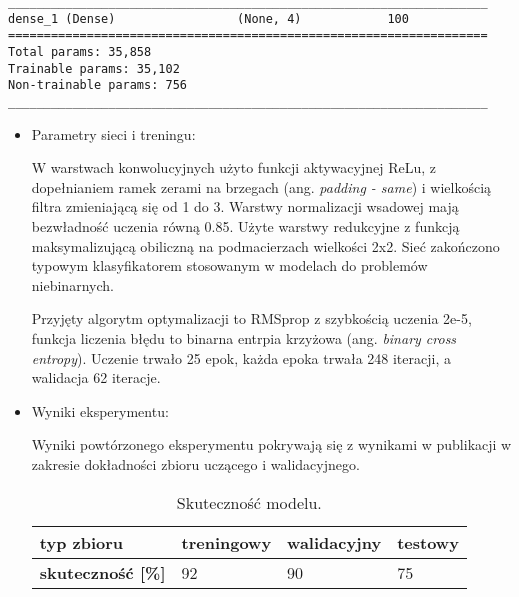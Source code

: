 \newsavebox\myvvvvv
\begin{lrbox}{\myvvvvv}
\setlength{\myminipagewidth}{0.9\linewidth} %
\setlength{\myminipagecentering}{(\linewidth-\myminipagewidth)/2}
\noindent\hspace{\myminipagecentering}\begin{minipage}{\myminipagewidth}
\begin{verbatim}
___________________________________________________________________
dense_1 (Dense)                 (None, 4)            100    
===================================================================
Total params: 35,858
Trainable params: 35,102
Non-trainable params: 756
___________________________________________________________________
\end{verbatim} 
\end{minipage}\end{lrbox}
\resizebox{0.75\textwidth}{!}{\usebox\myvvvvv}

\begin{itemize}
\item Parametry sieci i treningu:

W warstwach konwolucyjnych użyto funkcji aktywacyjnej ReLu, z dopełnianiem ramek zerami na brzegach (ang. \textit{padding - same}) i wielkością filtra zmieniającą się od 1 do 3. Warstwy normalizacji wsadowej mają bezwładność uczenia równą 0.85. Użyte warstwy redukcyjne z funkcją maksymalizującą obiliczną na podmacierzach wielkości 2x2. Sieć zakończono typowym klasyfikatorem stosowanym w modelach do problemów niebinarnych. 

Przyjęty algorytm optymalizacji to RMSprop z szybkością uczenia 2e-5, funkcja liczenia błędu to binarna entrpia krzyżowa (ang. \textit{binary cross entropy}). Uczenie trwało 25 epok, każda epoka trwała 248 iteracji, a walidacja 62 iteracje.
\item Wyniki eksperymentu:

Wyniki powtórzonego eksperymentu pokrywają się z wynikami w publikacji w zakresie dokładności zbioru uczącego i walidacyjnego.

\begin{table}[h]
\centering
\caption[Short Heading]{Skuteczność modelu.}
\begin{tabular}{|l|l|l|l|}
\hline
\textbf{typ zbioru}           & \textbf{treningowy} & \textbf{walidacyjny} & \textbf{testowy} \\ \hline
\textbf{skuteczność {[}\%{]}} & 92                  & 90                   & 75               \\ \hline
\end{tabular}
\end{table}

\end{itemize}

